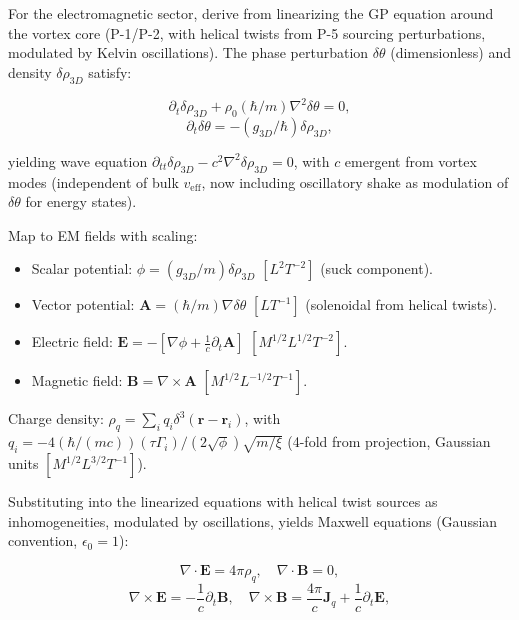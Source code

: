 For the electromagnetic sector, derive from linearizing the GP equation around the vortex core (P-1/P-2, with helical twists from P-5 sourcing perturbations, modulated by Kelvin oscillations). The phase perturbation $\delta \theta$ (dimensionless) and density $\delta \rho_{3D}$ satisfy:

\begin{equation}
\partial_t \delta \rho_{3D} + \rho_0 (\hbar / m) \nabla^2 \delta \theta = 0,
\end{equation}
\begin{equation}
\partial_t \delta \theta = - (g_{3D} / \hbar) \delta \rho_{3D},
\end{equation}

yielding wave equation $\partial_{tt} \delta \rho_{3D} - c^2 \nabla^2 \delta \rho_{3D} = 0$, with $c$ emergent from vortex modes (independent of bulk $v_{\text{eff}}$, now including oscillatory shake as modulation of $\delta \theta$ for energy states).

Map to EM fields with scaling:

\begin{itemize}
\item Scalar potential: $\phi = (g_{3D} / m) \delta \rho_{3D}$ $[L^2 T^{-2}]$ (suck component).
\item Vector potential: $\mathbf{A} = (\hbar / m) \nabla \delta \theta$ $[L T^{-1}]$ (solenoidal from helical twists).
\item Electric field: $\mathbf{E} = - \left[ \nabla \phi + \frac{1}{c} \partial_t \mathbf{A} \right]$ $[M^{1/2} L^{1/2} T^{-2}]$.
\item Magnetic field: $\mathbf{B} = \nabla \times \mathbf{A}$ $[M^{1/2} L^{-1/2} T^{-1}]$.
\end{itemize}

Charge density: $\rho_q = \sum_i q_i \delta^3(\mathbf{r} - \mathbf{r}_i)$, with $q_i = -4 (\hbar / (m c)) (\tau \Gamma_i) / (2 \sqrt{\phi}) \sqrt{m / \xi}$ (4-fold from projection, Gaussian units $[M^{1/2} L^{3/2} T^{-1}]$).

Substituting into the linearized equations with helical twist sources as inhomogeneities, modulated by oscillations, yields Maxwell equations (Gaussian convention, $\epsilon_0 = 1$):

\begin{equation}
\nabla \cdot \mathbf{E} = 4\pi \rho_q, \quad \nabla \cdot \mathbf{B} = 0,
\end{equation}
\begin{equation}
\nabla \times \mathbf{E} = -\frac{1}{c} \partial_t \mathbf{B}, \quad \nabla \times \mathbf{B} = \frac{4\pi}{c} \mathbf{J}_q + \frac{1}{c} \partial_t \mathbf{E},
\end{equation}

